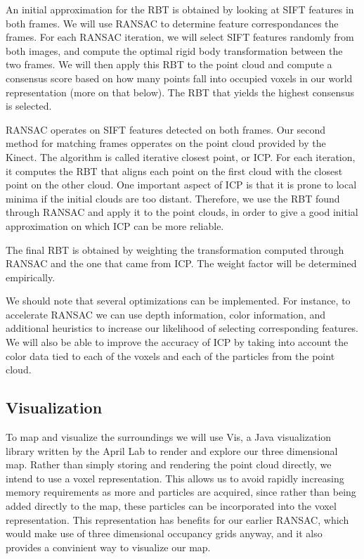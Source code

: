 \documentclass[12pt]{article}
\begin{document}
An initial approximation for the RBT is obtained by looking at SIFT features in both frames. We will use RANSAC to determine feature correspondances the frames.  For each RANSAC iteration, we will select SIFT features randomly from both images, and compute the optimal rigid body transformation between the two frames.  We will then apply this RBT to the point cloud and compute a consensus score based on how many points fall into occupied voxels in our world representation (more on that below).  The RBT that yields the highest consensus is selected.

RANSAC operates on SIFT features detected on both frames. Our second method for matching frames opperates on the point cloud provided by the Kinect. The algorithm is called iterative closest point, or ICP. For each iteration, it computes the RBT that aligns each point on the first cloud with the closest point on the other cloud. One important aspect of ICP is that it is prone to local minima if the initial clouds are too distant. Therefore, we use the RBT found through RANSAC and apply it to the point clouds, in order to give a good initial approximation on which ICP can be more reliable.

The final RBT is obtained by weighting the transformation computed through RANSAC and the one that came from ICP. The weight factor will be determined empirically.

We should note that several optimizations can be implemented. For instance,  to accelerate RANSAC we can use depth information, color information, and additional heuristics to increase our likelihood of selecting corresponding features. We will also be able to improve the accuracy of ICP by taking into account the color data tied to each of the voxels and each of the particles from the point cloud. 

\subsection{Visualization}
To map and visualize the surroundings we will use Vis, a Java visualization library written by the April Lab to render and explore our three dimensional map. Rather than simply storing and rendering the point cloud directly, we intend to use a voxel representation.  This allows us to avoid rapidly increasing memory requirements as more and particles are acquired, since rather than being added directly to the map, these particles can be incorporated into the voxel representation.  This representation has benefits for our earlier RANSAC, which would make use of three dimensional occupancy grids anyway, and it also provides a convinient way to visualize our map.
\end{document}
